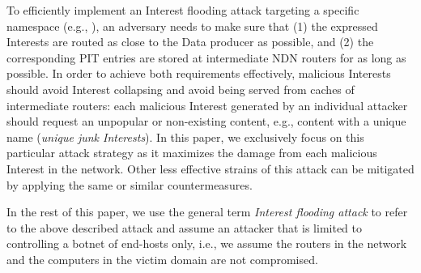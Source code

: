 
To efficiently implement an Interest flooding attack targeting a specific namespace (e.g., ), an adversary needs to make sure that (1) the expressed Interests are routed as close to the Data producer as possible, and (2) the corresponding PIT entries are stored at intermediate NDN routers for as long as possible.
In order to achieve both requirements effectively, malicious Interests should avoid Interest collapsing and avoid being served from caches of intermediate routers: each malicious Interest generated by an individual attacker should request an unpopular or non-existing content, e.g., content with a unique name (\emph{unique junk Interests}). In this paper, we exclusively focus on this particular attack strategy as it maximizes the damage from each malicious Interest in the network. Other less effective strains of this attack can be mitigated by applying the same or similar countermeasures.  

In the rest of this paper, we use the general term \emph{Interest flooding attack} to refer to the above described attack and assume an attacker that is limited to controlling a botnet of end-hosts only, i.e., we assume the routers in the network and the computers in the victim domain are not compromised.




